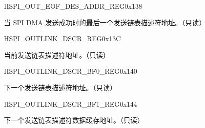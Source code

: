 \begin{register}{H}{SPI\_OUT\_EOF\_DES\_ADDR\_REG}{0x138}\label{regdesc:SPIOUTEOFDESADDRREG}
%
\regnewline%
\begin{regdesc}\begin{reglist}
\item [SPI\_OUT\_EOF\_DES\_ADDR\_REG] 当 SPI DMA 发送成功时的最后一个发送链表描述符地址。（只读）
\end{reglist}\end{regdesc}
\end{register}


\begin{register}{H}{SPI\_OUTLINK\_DSCR\_REG}{0x13C}\label{regdesc:SPIOUTLINKDSCRREG}
%
\regnewline%
\begin{regdesc}\begin{reglist}
\item [SPI\_OUTLINK\_DSCR\_REG] 当前发送链表描述符地址。（只读）
\end{reglist}\end{regdesc}
\end{register}


\begin{register}{H}{SPI\_OUTLINK\_DSCR\_BF0\_REG}{0x140}\label{regdesc:SPIOUTLINKDSCRBF0REG}
%
\regnewline%
\begin{regdesc}\begin{reglist}
\item [SPI\_OUTLINK\_DSCR\_BF0\_REG]下一个发送链表描述符地址。（只读）
\end{reglist}\end{regdesc}
\end{register}


\begin{register}{H}{SPI\_OUTLINK\_DSCR\_BF1\_REG}{0x144}\label{regdesc:SPIOUTLINKDSCRBF1REG}
%
\regnewline%
\begin{regdesc}\begin{reglist}
\item [SPI\_OUTLINK\_DSCR\_BF1\_REG] 下一个发送链表描述符数据缓存地址。（只读）
\end{reglist}\end{regdesc}
\end{register}

